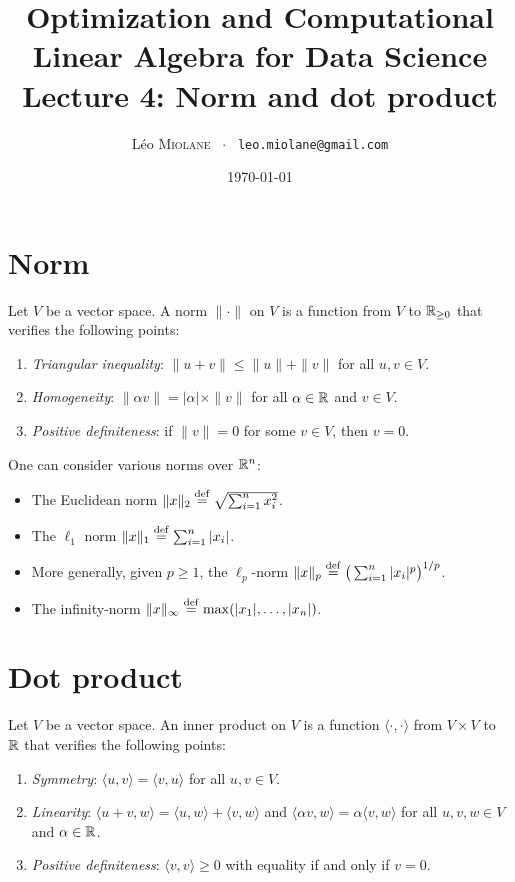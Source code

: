 \documentclass[11pt,nocut]{article}
\title{\vspace{-2.0cm}%
	Optimization and Computational Linear Algebra for Data Science\\
Lecture 4: Norm and dot product}
\author{Léo \textsc{Miolane} \ $\cdot$ \ \texttt{leo.miolane@gmail.com}}
\date{\today}
\begin{document}
\maketitle


\section{Norm}

\begin{definition}[Norm]
	Let $V$ be a vector space.
	A norm $\| \cdot \|$ on $V$ is a function from $V$ to $\mathbb{R}_{\geq 0}$ that verifies the following points:
	\begin{enumerate}[label=(\roman*)]
		\item \emph{Triangular inequality}: $\|u + v\| \leq \|u\| + \|v\|$ for all $u,v \in V$.
		\item \emph{Homogeneity}: $\| \alpha v \| = |\alpha|\times \| v\|$ for all $\alpha \in \mathbb{R}$ and  $v \in V$.
		\item \emph{Positive definiteness}: if $\|v\| = 0$ for some $v \in V$, then $v=0$.
	\end{enumerate}
\end{definition}

\begin{example}
	One can consider various norms over $\mathbb{R}^n$:
	\begin{itemize}
		\item The Euclidean norm $\|x\|_2 \overset{\rm def}{=} \sqrt{\sum_{i=1}^n x_i^2}$.
		\item The $\ell_1$ norm $\|x\|_1 \overset{\rm def}{=} \sum_{i=1}^n |x_i|$.
		\item More generally, given $p \geq 1$, the $\ell_p$-norm $\|x\|_p \overset{\rm def}{=} \big(\sum_{i=1}^n |x_i|^p \big)^{1/p}$.
		\item The infinity-norm $\|x \|_{\infty} \overset{\rm def}{=} \max(|x_1|, \dots, |x_n|)$.
	\end{itemize}
\end{example}


\section{Dot product}

\begin{definition}
	Let $V$ be a vector space.
	An inner product on $V$ is a function $\langle \cdot, \cdot \rangle$ from $V \times V$ to $\mathbb{R}$ that verifies the following points:
	\begin{enumerate}[label=(\roman*)]
		\item \emph{Symmetry}: $\langle u, v \rangle = \langle v, u\rangle$ for all $u,v \in V$.
		\item \emph{Linearity}: $\langle u+v, w \rangle = \langle u, w\rangle + \langle v, w\rangle$ and $\langle \alpha v, w \rangle = \alpha \langle v, w \rangle$ for all $u,v,w \in V$ and $\alpha \in \mathbb{R}$.
		\item \emph{Positive definiteness}: $\langle v, v\rangle \geq 0$ with equality if and only if $v = 0$.
	\end{enumerate}
\end{definition}
\end{document}
